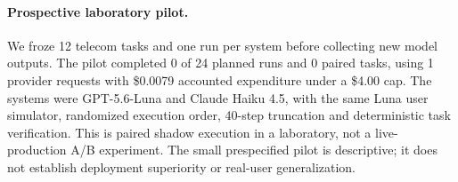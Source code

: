\paragraph{Prospective laboratory pilot.} We froze 12 telecom tasks and one run per system before collecting new model outputs. The pilot completed 0 of 24 planned runs and 0 paired tasks, using 1 provider requests with \$0.0079 accounted expenditure under a \$4.00 cap. The systems were GPT-5.6-Luna and Claude Haiku 4.5, with the same Luna user simulator, randomized execution order, 40-step truncation and deterministic task verification. This is paired shadow execution in a laboratory, not a live-production A/B experiment. The small prespecified pilot is descriptive; it does not establish deployment superiority or real-user generalization.
